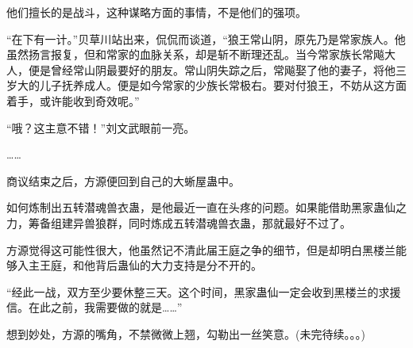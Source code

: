 \begin{this_body}
他们擅长的是战斗，这种谋略方面的事情，不是他们的强项。

“在下有一计。”贝草川站出来，侃侃而谈道，“狼王常山阴，原先乃是常家族人。他虽然扬言报复，但和常家的血脉关系，却是斩不断理还乱。当今常家族长常飚大人，便是曾经常山阴最要好的朋友。常山阴失踪之后，常飚娶了他的妻子，将他三岁大的儿子抚养成人。便是如今常家的少族长常极右。要对付狼王，不妨从这方面着手，或许能收到奇效呢。”

“哦？这主意不错！”刘文武眼前一亮。

……

商议结束之后，方源便回到自己的大蜥屋蛊中。

如何炼制出五转潜魂兽衣蛊，是他最近一直在头疼的问题。如果能借助黑家蛊仙之力，筹备组建异兽狼群，同时炼成五转潜魂兽衣蛊，那就最好不过了。

方源觉得这可能性很大，他虽然记不清此届王庭之争的细节，但是却明白黑楼兰能够入主王庭，和他背后蛊仙的大力支持是分不开的。

“经此一战，双方至少要休整三天。这个时间，黑家蛊仙一定会收到黑楼兰的求援信。在此之前，我需要做的就是……”

想到妙处，方源的嘴角，不禁微微上翘，勾勒出一丝笑意。(未完待续。。。)

\end{this_body}

